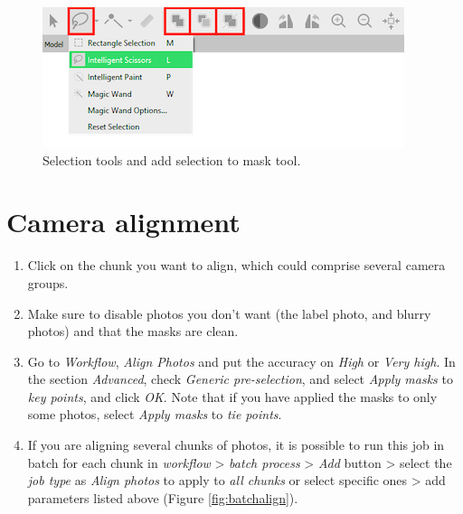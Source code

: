 \documentclass[
]{book}
\begin{document}
\begin{figure}

{\centering \includegraphics[width=0.8\linewidth]{Figures/tools_masks} 

}

\caption{Selection tools and add selection to mask tool.}\label{fig:toolsmasks}
\end{figure}

\hypertarget{camera-alignment}{%
\section{Camera alignment}\label{camera-alignment}}

\begin{enumerate}
\def\labelenumi{\arabic{enumi}.}
\item
  Click on the chunk you want to align, which could comprise several
  camera groups.
\item
  Make sure to disable photos you don't want (the label photo, and
  blurry photos) and that the masks are clean.
\item
  Go to \emph{Workflow}, \emph{Align Photos} and put the accuracy on \emph{High} or
  \emph{Very high}. In the section \emph{Advanced}, check \emph{Generic
  pre-selection}, and select \emph{Apply masks} to \emph{key points}, and click
  \emph{OK}. Note that if you have applied the masks to only some photos,
  select \emph{Apply masks} to \emph{tie points}.
\item
  If you are aligning several chunks of photos, it is possible to run
  this job in batch for each chunk in \emph{workflow} \textgreater{} \emph{batch process} \textgreater{}
  \emph{Add} button \textgreater{} select the \emph{job type} as \emph{Align photos} to apply to
  \emph{all chunks} or select specific ones \textgreater{} add parameters listed above
  (Figure \ref{fig:batchalign}).
\end{enumerate}
\end{document}
